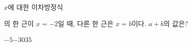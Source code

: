 $x$에 대한 이차방정식 \par\smallskip{}\par\smallskip\noindent 의 한 근이 $x=-2$일 때, 다른 한 근은 $x=b$이다. $a+b$의 값은? 
\begin{choices32}{$-5$}{$-3$}{$0$}{$3$}{$5$}\end{choices32}
